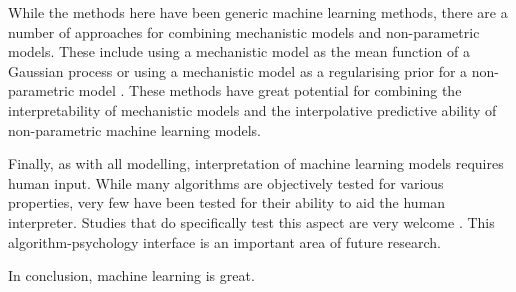 \documentclass[10pt,]{article}
\begin{document}
While the methods here have been generic machine learning methods, there are a number of approaches for combining mechanistic models and non-parametric models. These include using a mechanistic model as the mean function of a Gaussian process \citep{rasmussen2004gaussian} or using a mechanistic model as a regularising prior for a non-parametric model \citep{lyddon2018nonparametric}. These methods have great potential for combining the interpretability of mechanistic models and the interpolative predictive ability of non-parametric machine learning models.

Finally, as with all modelling, interpretation of machine learning models requires human input. While many algorithms are objectively tested for various properties, very few have been tested for their ability to aid the human interpreter. Studies that do specifically test this aspect are very welcome \citep{bastani2017interpreting}. This algorithm-psychology interface is an important area of future research.

In conclusion, machine learning is great.


\end{document}
